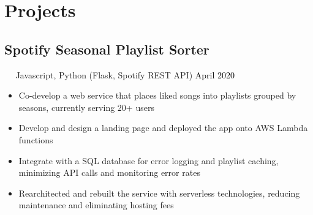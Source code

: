 \documentclass{article}
\newcommand{\resumesection}[3]{
    \subsection*{#1}
    \ 
    \ 
    \small
    \textcolor{csufgrey}{#2}
    \normalsize
    \hfill
    \textcolor{black}{#3}
    \normalsize
}
\begin{document}
\section*{Projects}

\resumesection{Spotify Seasonal Playlist Sorter}{Javascript, Python (Flask, Spotify REST API)}{April 2020}
\begin{itemize}
    \item Co-develop a web service that places liked songs into playlists grouped by seasons, currently serving 20+ users
    \item Develop and design a landing page and deployed the app onto AWS Lambda functions
    \item Integrate with a SQL database for error logging and playlist caching, minimizing API calls and monitoring error rates
    \item Rearchitected and rebuilt the service with serverless technologies, reducing maintenance and eliminating hosting fees
\end{itemize}

\end{document}
